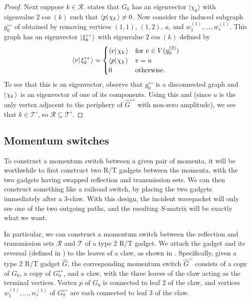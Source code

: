 \documentclass[../thesis-main/thesis-main]{subfiles}
\begin{document}
\begin{proof}
Next suppose $k\in \mathcal{R}$.  states that $G_0$ has an eigenvector $|\chi_k\rangle$ with eigenvalue $2\cos(k)$ such that $\langle p |\mspace{2mu} \chi_k \mspace{2mu} \rangle \neq 0$.  Now consider the induced subgraph $g_0^{\leftrightarrow}$ of  obtained by removing vertices $(1,1)$, $(1,2)$, $a$, and $w^{(1)}_1,\ldots,w^{(1)}_{r}$. This graph has an eigenvector $|\mspace{2mu} \xi^{\leftrightarrow}_k \mspace{2mu} \rangle$ with eigenvalue $2\cos(k)$ defined by
\begin{equation}
  \langle v |\mspace{2mu} \xi^{\leftrightarrow}_k \mspace{2mu} \rangle = \begin{cases} \langle{v}|\mspace{2mu} \chi_k \mspace{2mu} \rangle& \text{for }v\in V(g_0^{(2)}) \\
    \langle{p}|\mspace{2mu} \chi_k \mspace{2mu} \rangle & v = u\\
0 &\text{otherwise.} \end{cases}
\end{equation}
To see that this is an eigenvector, observe that $g_0^{\leftrightarrow}$ is a disconnected graph and $|\mspace{2mu} \chi_k \mspace{2mu} \rangle$ is an eigenvector of one of its components.  Using this and  (since $u$ is the only vertex adjacent to the periphery of $\hat{G}^{\leftrightarrow}$ with non-zero amplitude), we see that $k\in \mathcal{T}'$, so $\mathcal{R} \subseteq \mathcal{T}'$.
\end{proof}



\subsection{Momentum switches}

To construct a momentum switch between a given pair of momenta, it will be worthwhile to first construct two R/T gadgets between the momenta, with the two gadgets having swapped reflection and transmission sets.  We can then construct something like a railroad switch, by placing the two gadgets immediately after a 3-claw.  With this design, the incident wavepacket will only see one of the two outgoing paths, and the resulting $S$-matrix will be exactly what we want.

In particular, we can construct a momentum switch between the reflection and transmission sets $\mathcal{R}$ and $\mathcal{T}$ of a type 2 R/T gadget.  We attach the gadget and its reversal (defined in ) to the leaves of a claw, as shown in .  Specifically, given a type 2 R/T gadget $\widehat{G}$, the corresponding momentum switch $\widehat{G}^{\prec}$ consists of a copy of $G_0$, a copy of $G_{0}^{\leftrightarrow}$, and a claw, with the three leaves of the claw acting as the terminal vertices.  Vertex $p$ of $G_0$ is connected to leaf $2$ of the claw, and vertices $w_1^{(1)},\ldots,w_r^{(1)}$ of $G_{0}^{\leftrightarrow}$ are each connected to leaf $3$ of the claw.
\end{document}
